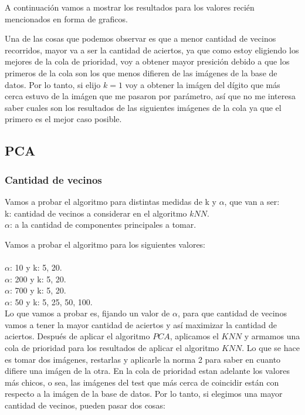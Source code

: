 A continuaci\'on vamos a mostrar los resultados para los valores reci\'en mencionados en forma de graficos.

Una de las cosas que podemos observar es que a menor cantidad de vecinos recorridos, mayor va a ser la cantidad de aciertos, ya que como estoy eligiendo los mejores de la cola de prioridad, voy a obtener mayor presici\'on debido a que los primeros de la cola son los que menos difieren de las im\'agenes de la base de datos.
Por lo tanto, si elijo $k = 1$ voy a obtener la im\'agen del d\'igito que m\'as cerca estuvo de la imágen que me pasaron por parámetro, así que no me interesa saber cuales son los resultados de las siguientes imágenes de la cola ya que el primero es el mejor caso posible.

\subsection{PCA}
\subsubsection{Cantidad de vecinos}
Vamos a probar el algoritmo para distintas medidas de k y $\alpha$, que van a ser:\\
k: cantidad de vecinos a considerar en el algoritmo $kNN$.\\
$\alpha$: a la cantidad de componentes principales a tomar.

Vamos a probar el algoritmo para los siguientes valores:\\ \\
$\alpha$: 10  y k: 5, 20.\\
$\alpha$: 200 y k: 5, 20.\\
$\alpha$: 700 y k: 5, 20.\\
$\alpha$: 50  y k: 5, 25, 50, 100.\\

Lo que vamos a probar es, fijando un valor de $\alpha$, para que cantidad de vecinos vamos a tener la mayor cantidad de aciertos y así maximizar la cantidad de aciertos.
Después de aplicar el algoritmo $PCA$, aplicamos el $KNN$ y armamos una cola de prioridad para los resultados de aplicar el algoritmo $KNN$. Lo que se hace es tomar dos imágenes, restarlas y aplicarle la norma 2 para saber en cuanto difiere una imágen de la otra. En la cola de prioridad estan adelante los valores más chicos, o sea, las imágenes del test que más cerca de coincidir están con respecto a la imágen de la base de datos.
Por lo tanto, si elegimos una mayor cantidad de vecinos, pueden pasar dos cosas:

